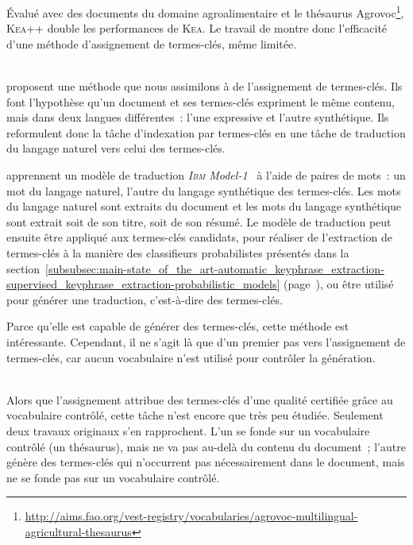     Évalué avec des documents du domaine agroalimentaire et le thésaurus
    Agrovoc\footnote{\url{http://aims.fao.org/vest-registry/vocabularies/agrovoc-multilingual-agricultural-thesaurus}},
    \textsc{Kea}++ double les performances de \textsc{Kea}. Le travail de
     montre donc l'efficacité d'une méthode
    d'assignement de termes-clés, même limitée.

    ~\\ proposent une méthode que nous assimilons
    à de l'assignement de termes-clés. Ils font l'hypothèse qu'un document et
    ses termes-clés expriment le même contenu, mais dans deux langues
    différentes~: l'une expressive et l'autre synthétique. Ils reformulent donc
    la tâche d'indexation par termes-clés en une tâche de traduction du langage
    naturel vers celui des termes-clés.
    
     apprennent un modèle de traduction
    \textit{\textsc{Ibm} Model-1}~\cite{brown1993ibmmodel1} à l'aide de paires
    de mots~: un mot du langage naturel, l'autre du langage synthétique des
    termes-clés. Les mots du langage naturel sont extraits du document et les
    mots du langage synthétique sont extrait soit de son titre, soit de son
    résumé. Le modèle de traduction peut ensuite être appliqué aux termes-clés
    candidats, pour réaliser de l'extraction de termes-clés à la manière des
    classifieurs probabilistes présentés dans la
    section~\ref{subsubsec:main-state_of_the_art-automatic_keyphrase_extraction-supervised_keyphrase_extraction-probabilistic_models}
    (page~\pageref{subsubsec:main-state_of_the_art-automatic_keyphrase_extraction-supervised_keyphrase_extraction-probabilistic_models}),
    ou être utilisé pour générer une traduction, c'est-à-dire des termes-clés.

    Parce qu'elle est capable de générer des termes-clés, cette méthode est
    intéressante. Cependant, il ne s'agit là que d'un premier pas vers
    l'assignement de termes-clés, car aucun vocabulaire n'est utilisé pour
    contrôler la génération.

    ~\\Alors que l'assignement attribue des termes-clés d'une qualité certifiée
    grâce au vocabulaire contrôlé, cette tâche n'est encore que très peu
    étudiée. Seulement deux travaux originaux s'en rapprochent. L'un se fonde
    sur un vocabulaire contrôlé (un thésaurus), mais ne va pas au-delà du
    contenu du document~; l'autre génère des termes-clés qui n'occurrent pas
    nécessairement dans le document, mais ne se fonde pas sur un vocabulaire
    contrôlé.

